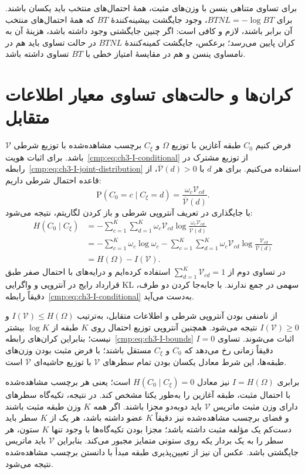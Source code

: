 برای تساوی متناهی ینسن با وزن‌های مثبت، همهٔ احتمال‌های
منتخب باید یکسان باشند. برای $BTNL=-\log BT$،
وجود جایگشت بیشینه‌کنندهٔ $BT$ که همهٔ احتمال‌های
منتخب آن برابر باشند، لازم و کافی است: اگر چنین
جایگشتی وجود داشته باشد، هزینهٔ آن به کران پایین
می‌رسد؛ برعکس، جایگشت کمینه‌کنندهٔ $BTNL$ در
حالت تساوی باید هم در نامساوی ینسن و هم در
مقایسهٔ امتیاز خطی با $BT$ تساوی داشته باشد.

\section{کران‌ها و حالت‌های تساوی معیار اطلاعات متقابل}
\label{app:ch3-I-bounds-proof}
فرض کنیم $C_0$ طبقه آغازین با توزیع $\Omega$ و $C_\xi$ برچسب مشاهده‌شده با توزیع شرطی $\mathcal V$ باشد. برای اثبات هویت~\eqref{cmp:eq:ch3-I-conditional} از توزیع مشترک در رابطه~\eqref{cmp:eq:ch3-I-joint-distribution} استفاده می‌کنیم. برای هر $d$ با $\overline{\mathcal V}(d)>0$، از قاعده احتمال شرطی داریم:
\[
\mathrm P(C_0=c\mid C_\xi=d)
=\frac{\omega_c\mathcal V_{cd}}{\overline{\mathcal V}(d)}.
\]
با جایگذاری در تعریف آنتروپی شرطی و باز کردن لگاریتم، نتیجه می‌شود:
\begin{equation}\label{eq:app-ch3-I-conditional-proof}
\begin{aligned}
H(C_0\mid C_\xi)
&=-\sum_{c=1}^{K}\sum_{d=1}^{K}
\omega_c\mathcal V_{cd}
\log\frac{\omega_c\mathcal V_{cd}}{\overline{\mathcal V}(d)}\\
&=-\sum_{c=1}^{K}\omega_c\log\omega_c
-\sum_{c=1}^{K}\sum_{d=1}^{K}
\omega_c\mathcal V_{cd}
\log\frac{\mathcal V_{cd}}{\overline{\mathcal V}(d)}\\
&=H(\Omega)-I(\mathcal V).
\end{aligned}
\end{equation}
در تساوی دوم از $\sum_{d=1}^{K}\mathcal V_{cd}=1$ استفاده کرده‌ایم و درایه‌های با احتمال صفر طبق قرارداد رایج در آنتروپی و واگرایی KL سهمی در جمع ندارند. با جابه‌جا کردن دو طرف، دقیقاً رابطه~\eqref{cmp:eq:ch3-I-conditional} به‌دست می‌آید.

از نامنفی بودن آنتروپی شرطی و اطلاعات متقابل، به‌ترتیب $I(\mathcal V)\le H(\Omega)$ و $I(\mathcal V)\ge0$ نتیجه می‌شود. همچنین آنتروپی توزیع احتمال روی $K$ طبقه از $\log K$ بیشتر نیست؛ بنابراین کران‌های رابطه~\eqref{cmp:eq:ch3-I-bounds} اثبات می‌شوند.
تساوی $I=0$ دقیقاً زمانی رخ می‌دهد که $C_0$ و $C_\xi$ مستقل باشند؛ با فرض مثبت بودن وزن‌های طبقه‌ها، این شرط معادل یکسان بودن تمام سطرهای $\mathcal V$ با توزیع حاشیه‌ای $\overline{\mathcal V}$ است.

برابری $I=H(\Omega)$ نیز معادل $H(C_0\mid C_\xi)=0$ است؛ یعنی هر برچسب مشاهده‌شده با احتمال مثبت، طبقه آغازین را به‌طور یکتا مشخص کند. در نتیجه، تکیه‌گاه سطرهای دارای وزن مثبت ماتریس $\mathcal V$ باید دوبه‌دو مجزا باشند. اگر همه $K$ وزن طبقه مثبت باشند و فضای برچسب مشاهده‌شده نیز دقیقاً $K$ عضو داشته باشد، هر یک از $K$ سطر باید دست‌کم یک مؤلفه مثبت داشته باشد؛ مجزا بودن تکیه‌گاه‌ها با وجود تنها $K$ ستون، هر سطر را به یک بردار یکه روی ستونی متمایز مجبور می‌کند. بنابراین $\mathcal V$ باید ماتریس جایگشتی باشد. عکس آن نیز از تعیین‌پذیری طبقه مبدأ با دانستن برچسب مشاهده‌شده نتیجه می‌شود.

